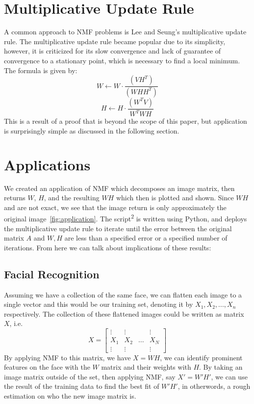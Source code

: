 \documentclass[
10pt, %
a4paper, %
oneside, %
headinclude,footinclude, %
BCOR5mm, %
]{scrartcl}
\begin{document}
\section{Multiplicative Update Rule}

A common approach to NMF problems is Lee and Seung's multiplicative update rule. The multiplicative update rule became popular due to its simplicity, however, it is criticized for its slow convergence and lack of guarantee of convergence to a stationary point, which is necessary to find a local minimum.
The formula is given by\cite{algorithms}:
$$W\leftarrow W\cdot\frac{(VH^{T})}{(WHH^{T})}$$
$$H\leftarrow H\cdot\frac{(W^{T}V)}{W^{T}WH}$$
This is a result of a proof that is beyond the scope of this paper, but application is surprisingly simple as discussed in the following section.

\section{Applications}
We created an application of NMF which decomposes an image matrix, then returns $W$, $H$, and the resulting $WH$ which then is plotted and shown. Since $WH$ and are not exact, we see that the image return is only approximately the original image~\vref{fig:application}. The script\textsuperscript{2} is written using Python, and deploys the multiplicative update rule to iterate until the error between the original matrix $A$ and $W,H$ are less than a specified error or a specified number of iterations. From here we can talk about implications of these results:

\let\thefootnote\relax{}

\subsection{Facial Recognition}
Assuming we have a collection of the same face, we can flatten each image to a single vector and this would be our training set, denoting it by $X_{1},X_{2},...,X_{n}$ respectively. The collection of these flattened images could be written as matrix $X$, i.e.
$$X=\begin{bmatrix}
        \vdots & \vdots &       & \vdots \\
        X_{1}  & X_{2}  & \dots & X_{N}  \\
        \vdots & \vdots &       & \vdots
    \end{bmatrix}$$
By applying NMF to this matrix, we have $X=WH$, we can identify prominent features on the face with the $W$ matrix and their weights with $H$. By taking an image matrix outside of the set, then applying NMF, say $X'=W'H'$, we can use the result of the training data to find the best fit of $W'H'$, in otherwords, a rough estimation on who the new image matrix is.
\end{document}
